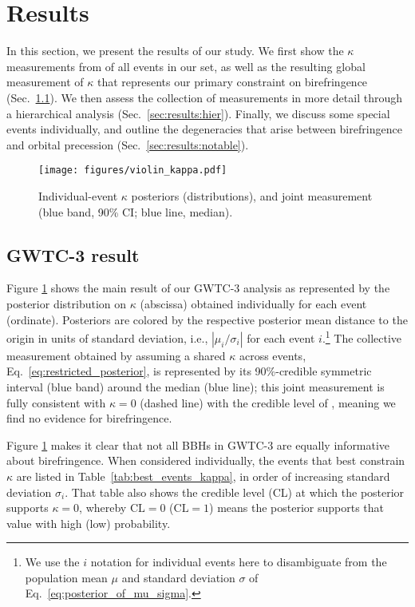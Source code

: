 \documentclass[aps,prd,twocolumn,superscriptaddress,preprintnumbers,floatfix,nofootinbib]{revtex4-2}
\begin{document}
\section{Results}
\label{sec:Results}

In this section, we present the results of our study.
We first show the $\kappa$ measurements from of all events in our set, as well as the resulting global measurement of $\kappa$ that represents our primary constraint on birefringence (Sec.~\ref{sec:results:gwtc}).
We then assess the collection of measurements in more detail through a hierarchical analysis (Sec.~\ref{sec:results:hier}).
Finally, we discuss some special events individually, and outline the degeneracies that arise between birefringence and orbital precession (Sec.~\ref{sec:results:notable}).

\begin{figure}
    \texttt{[image: figures/violin\_kappa.pdf]}
    \caption{
        Individual-event $\kappa$ posteriors (distributions), and joint measurement (blue band, 90\% CI; blue line, median).
    }
    \label{fig:violin_kappa}
\end{figure}

\subsection{GWTC-3 result}
\label{sec:results:gwtc}

Figure \ref{fig:violin_kappa} shows the main result of our GWTC-3 analysis as represented by the posterior distribution on $\kappa$ (abscissa) obtained individually for each event (ordinate).
Posteriors are colored by the respective posterior mean distance to the origin in units of standard deviation, i.e., $|\mu_i/\sigma_i|$ for each event $i$.\footnote{We use the $i$ notation for individual events here to disambiguate from the population mean $\mu$ and standard deviation $\sigma$ of Eq.~\eqref{eq:posterior_of_mu_sigma}.}
The collective measurement obtained by assuming a shared $\kappa$ across events, Eq.~\eqref{eq:restricted_posterior}, is represented by its 90\%-credible symmetric interval (blue band) around the median (blue line); this joint measurement is fully consistent with $\kappa = 0$ (dashed line) with the credible level of , meaning we find no evidence for birefringence.

Figure \ref{fig:violin_kappa} makes it clear that not all \acp{BBH} in GWTC-3 are equally informative about birefringence.
When considered individually, the events that best constrain $\kappa$ are listed in Table~\ref{tab:best_events_kappa}, in order of increasing standard deviation $\sigma_i$.
That table also shows the credible level (CL) at which the posterior supports $\kappa = 0$, whereby $\mathrm{CL} = 0$ ($\mathrm{CL} = 1$) means the posterior supports that value with high (low) probability.
\end{document}
